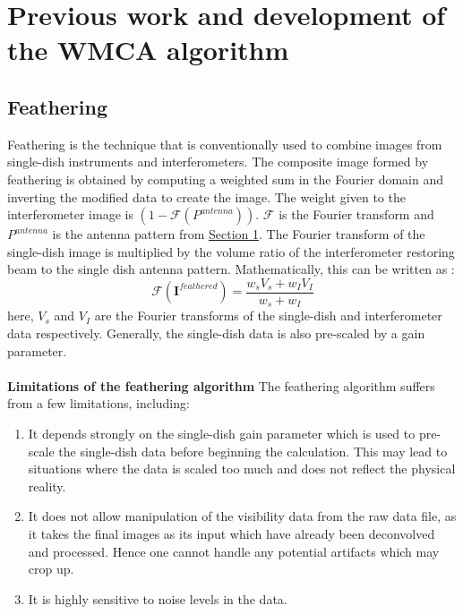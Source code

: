 \documentclass[twocolumn]{aastex61}
\begin{document}
\section{Previous work and development of the WMCA algorithm}\label{Sec:Section2}
\subsection{Feathering}
Feathering is the technique that is conventionally used to combine images from single-dish instruments and interferometers. The composite image formed by feathering is obtained by computing a weighted sum in the Fourier
domain and inverting the modified data to create the image. The weight given to the interferometer image is $(1-\mathcal{F}(P^{antenna}))$. $\mathcal{F}$ is the Fourier transform and $P^{antenna}$ is the antenna pattern from \hyperref[sec:intro]{Section 1}. The Fourier transform of the single-dish image is multiplied by the volume ratio of the interferometer restoring beam to the single dish antenna pattern. Mathematically, this can be written as : 
\begin{equation}
\mathcal{F}(\textbf{I}^{feathered}) = \frac{w_s V_s + w_I V_I}{w_s+w_I}
\end{equation}
here, $V_s$ and $V_I$ are the Fourier transforms of the single-dish and interferometer data respectively. Generally, the single-dish data is also pre-scaled by a gain parameter.\\\\
\textbf{Limitations of the feathering algorithm}
The feathering algorithm suffers from a few limitations, including:
\begin{enumerate}
\item It depends strongly on the single-dish gain parameter which is used to pre-scale the single-dish data before beginning the calculation. This may lead to situations where the data is scaled too much and does not reflect the physical reality.
\item It does not allow manipulation of the visibility data from the raw data file, as it takes the final images as its input which have already been deconvolved and processed. Hence one cannot handle any potential artifacts which may crop up.
\item It is highly sensitive to noise levels in the data. 
\end{enumerate}
\end{document}
